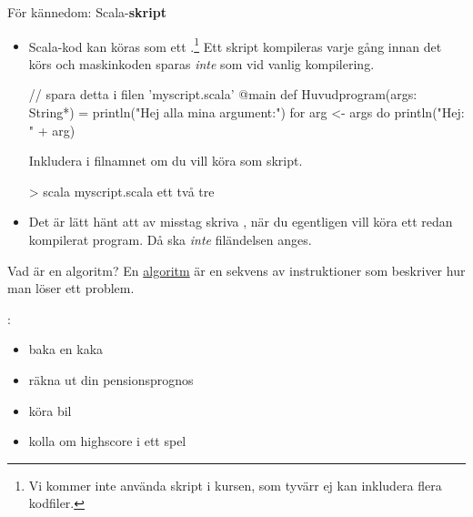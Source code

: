 \begin{Slide}{För kännedom: Scala-\textbf{skript}}
\begin{itemize}
  \item 
\SlideFontSmall
Scala-kod kan köras som ett .\footnote{\SlideFontTiny Vi kommer inte använda skript i kursen, som tyvärr ej kan inkludera flera kodfiler.
}
Ett skript kompileras varje gång innan det körs och maskinkoden sparas \emph{inte} som vid vanlig kompilering. 

\begin{Code}
// spara detta i filen 'myscript.scala'
@main def Huvudprogram(args: String*) =
  println("Hej alla mina argument:")
  for arg <- args do println("Hej: " + arg)
\end{Code}
Inkludera  i filnamnet om du vill köra som skript.  
\begin{REPLnonum}
> scala myscript.scala ett två tre
\end{REPLnonum}
\item
Det är lätt hänt att av misstag skriva , när du egentligen vill köra ett redan kompilerat program. Då ska \emph{inte} filändelsen  anges.
\end{itemize}
\end{Slide}




\begin{Slide}{Vad är en algoritm?}
En \href{https://sv.wikipedia.org/wiki/Algoritm}{algoritm} är en sekvens av instruktioner som beskriver hur man löser ett problem.

\vspace{1em}:
\begin{itemize}
\item	 baka en kaka
\pause\item räkna ut din pensionsprognos
\pause\item köra bil
\pause\item kolla om highscore i ett spel
\end{itemize}
\ifkompendium\else
{}
\fi
\end{Slide}


